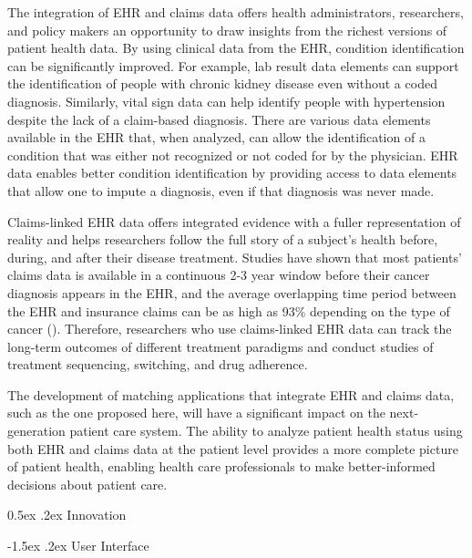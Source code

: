 \documentclass[11pt,]{article}
\makeatletter
\renewcommand\subsection{
  \@startsection{subsection}{2}{\z@}
    {-1.5ex\@plus -1ex \@minus -.2ex}%
    {0.5ex \@plus .2ex}%
    {\normalfont\normalsize\bf}} %
\renewcommand\paragraph{
  \@startsection{paragraph}{4}{\z@}
    {-0.5ex\@plus -1ex \@minus -.2ex}%
    {-1.5ex \@plus .2ex}%
    {\normalfont\normalsize\bf}} %
\makeatother
\begin{document}
The integration of EHR and claims data offers health administrators,
researchers, and policy makers an opportunity to draw insights from the
richest versions of patient health data. By using clinical data from the
EHR, condition identification can be significantly improved. For
example, lab result data elements can support the identification of
people with chronic kidney disease even without a coded diagnosis.
Similarly, vital sign data can help identify people with hypertension
despite the lack of a claim-based diagnosis. There are various data
elements available in the EHR that, when analyzed, can allow the
identification of a condition that was either not recognized or not
coded for by the physician. EHR data enables better condition
identification by providing access to data elements that allow one to
impute a diagnosis, even if that diagnosis was never made.

Claims-linked EHR data offers integrated evidence with a fuller
representation of reality and helps researchers follow the full story of
a subject's health before, during, and after their disease treatment.
Studies have shown that most patients' claims data is available in a
continuous 2-3 year window before their cancer diagnosis appears in the
EHR, and the average overlapping time period between the EHR and
insurance claims can be as high as 93\% depending on the type of cancer
(\cite{article3}). Therefore, researchers who use claims-linked EHR data
can track the long-term outcomes of different treatment paradigms and
conduct studies of treatment sequencing, switching, and drug adherence.

The development of matching applications that integrate EHR and claims
data, such as the one proposed here, will have a significant impact on
the next-generation patient care system. The ability to analyze patient
health status using both EHR and claims data at the patient level
provides a more complete picture of patient health, enabling health care
professionals to make better-informed decisions about patient care.

\subsection{Innovation}\label{innovation}

\paragraph{User Interface}\label{user-interface}
\end{document}
